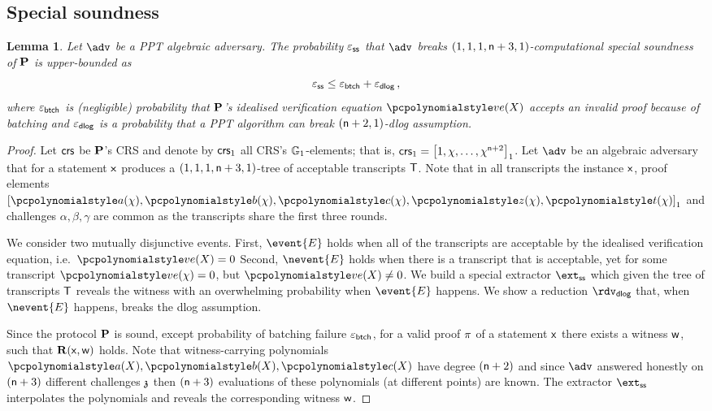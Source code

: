\documentclass[runningheads,11pt]{llncs}
\newtheorem{lemma}[theorem]{Lemma}
\theoremstyle{definition}
\begin{document}
\subsection{Special soundness}
\begin{lemma}
	\label{lem:plonkprot_ss}
	Let $\adv$ be a PPT algebraic adversary. The probability $\varepsilon_{\mathsf{ss}}$ that $\adv$ breaks 
	 $(1, 1, 1, \mathsf{n} + 3, 1)$-computational special soundness of $\mathbf{P}$ is upper-bounded as
	 \[
	 	\varepsilon_{\mathsf{ss}} \leq \varepsilon_{\mathsf{btch}} + \varepsilon_{\mathsf{dlog}}\,,
	 \] 
	 where $\varepsilon_{\mathsf{btch}}$ is (negligible) probability that $\mathbf{P}$'s idealised verification equation $\vereq(X)$ accepts an invalid proof because of batching and $\varepsilon_{\mathsf{dlog}}$ is a probability that a PPT algorithm can break $(\mathsf{n} + 2, 1)$-dlog assumption.
\end{lemma}
\begin{proof}
	Let $\mathsf{crs}$ be $\mathbf{P}$'s CRS and denote by $\mathsf{crs}_1$ all CRS's $\mathbb{G}_1$-elements; that is, $\mathsf{crs}_1 = \left[1, \chi, \ldots, \chi^{\mathsf{n} + 2}\right]_{1}$. 
	Let $\adv$ be an algebraic adversary that for a statement $\mathsf{x}$ produces a $(1, 1, 1, \mathsf{n} + 3, 1)$-tree of acceptable transcripts $\mathsf{T}$. %
	Note that in all transcripts the instance $\mathsf{x}$, proof elements $\gone{\p{a}(\chi), \p{b}(\chi), \p{c}(\chi), \p{z}(\chi), \p{t}(\chi)}$ and challenges $\alpha, \beta, \gamma$ are common as the transcripts share the first three rounds. 
	
	We consider two mutually disjunctive events. 
	First, $\event{E}$ holds when all of the transcripts are acceptable by the idealised verification equation, i.e.~$\vereq(X) = 0$ 
	Second, $\nevent{E}$ holds when there is a transcript that is acceptable, yet 
	for some transcript $\vereq(\chi) = 0$, but $\vereq(X) \neq 0$.
	We build a special extractor $\extss$ which given the tree of transcripts $\mathsf{T}$ reveals the witness with an overwhelming probability when $\event{E}$ happens. 
	We show a reduction $\rdvdlog$ that, when $\nevent{E}$ happens, breaks the dlog assumption. 
	
	  Since the protocol $\mathbf{P}$ is sound,
	except probability of batching failure $\varepsilon_{\mathsf{btch}}$, for a valid proof
	$\pi$ of a statement $\mathsf{x}$ there exists a witness $\mathsf{w}$, such that
	$\mathbf{R}(\mathsf{x}, \mathsf{w})$ holds.  Note that witness-carrying polynomials $\p{a}(X),
	\p{b}(X), \p{c}(X)$ have degree $(\mathsf{n} + 2)$ and since $\adv$
	answered honestly on $(\mathsf{n} + 3)$ different challenges $\mathfrak{z}$
	then $(\mathsf{n} + 3)$ evaluations of these polynomials (at
	different points) are known. The extractor $\extss$ interpolates the
	polynomials and reveals the corresponding witness $\mathsf{w}$. 
	

\end{proof}
\end{document}
